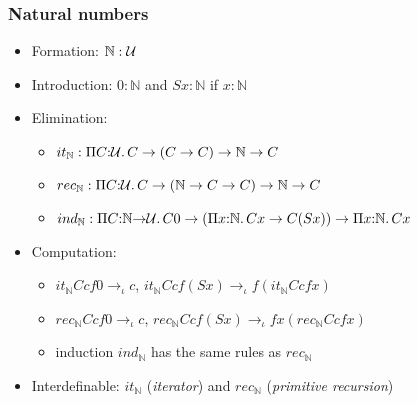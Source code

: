 \documentclass[handout]{beamer}
\newcommand{\depi}[3]{\Pi{#1{:}#2.\,#3}}
\newcommand{\Nat}{\mathbb{N}}
\newcommand{\UU}{{\cal U}}
\begin{document}
\frame
  {
  
    \frametitle{Natural numbers}

    \begin{itemize}[<+->]
    \item Formation:  $\Nat:\UU$
    \item Introduction: $0:\Nat$ and $S x:\Nat$ if $x:\Nat$
    \item Elimination:
      \begin{itemize}[<+->]
      \item $it_\Nat : \depi{C}{\UU}{C \to (C\to C) \to \Nat \to C}$
      \item $rec_\Nat : \depi{C}{\UU}{C \to (\Nat \to C\to C) \to \Nat \to C}$
      \item $ind_\Nat : \depi{C}{\Nat{\to}\UU}{C0 \to (\depi{x}{\Nat}{Cx\to C(Sx)}) \to \depi{x}{\Nat}{Cx}}$
      \end{itemize}  
    \item Computation:
      \begin{itemize}[<+->]
      \item $it_\Nat C c f 0 \to_\iota c$, $it_\Nat C c f (Sx) \to_\iota f(it_\Nat C c f x)$
      \item $rec_\Nat C c f 0 \to_\iota c$, $rec_\Nat C c f (Sx) \to_\iota fx(rec_\Nat C c f x)$
      \item induction $ind_\Nat$ has the same rules as $rec_\Nat$
      \end{itemize}  
    \item Interdefinable: $it_\Nat$ (\emph{iterator}) and $rec_\Nat$ (\emph{primitive recursion})
    \end{itemize}
  }
\end{document}
